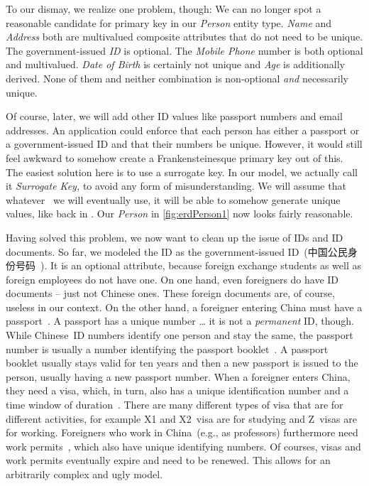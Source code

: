 To our dismay, we realize one problem, though:
We can no longer spot a reasonable candidate for primary key in our \emph{Person} entity type.
\emph{Name} and \emph{Address} both are multivalued composite attributes that do not need to be unique.
The government-issued \emph{ID} is optional.
The \emph{Mobile Phone} number is both optional and multivalued.
\emph{Date of Birth} is certainly not unique and \emph{Age} is additionally derived.
None of them and neither combination is non-optional \emph{and} necessarily unique.

Of course, later, we will add other ID values like passport numbers and email addresses.
An application could enforce that each person has either a passport or a government-issued ID and that their numbers be unique.
However, it would still feel awkward to somehow create a Frankensteinesque primary key out of this.
The easiest solution here is to use a surrogate key.
In our model, we actually call it \emph{Surrogate Key,} to avoid any form of misunderstanding.
We will assume that whatever \dbms\ we will eventually use, it will be able to somehow generate unique values, like back in .
Our \emph{Person} in \cref{fig:erdPerson1} now looks fairly reasonable.

Having solved this problem, we now want to clean up the issue of IDs and ID documents.
So far, we modeled the ID as the government-issued ID~(中国公民身份号码~\cite{GB116431999CIN}).
It is an optional attribute, because foreign exchange students as well as foreign employees do not have one.
On one hand, even foreigners do have ID documents -- just not Chinese ones.
These foreign documents are, of course, useless in our context.
On the other hand, a foreigner entering China must have a passport~\cite{ICAO2021MRTDP3SCTAMEE}.
A passport has a unique number {\dots} it is not a \emph{permanent} ID, though.
While Chinese~ID numbers identify one person and stay the same, the passport number is usually a number identifying the passport booklet~\cite{ICAO2004TAGOMRTDFMUOPINAPN}.
A passport booklet usually stays valid for ten years and then a new passport is issued to the person, usually having a new passport number.
When a foreigner enters China, they need a visa, which, in turn, also has a unique identification number and a time window of duration~\cite{CMOFA2019ITCV}.
There are many different types of visa that are for different activities, for example X1 and X2~visa are for studying and Z~visas are for working.
Foreigners who work in China~(e.g., as professors) furthermore need work permits~\cite{BD2006BDBK:WOFFITOROC}, which also have unique identifying numbers.
Of courses, visas and work permits eventually expire and need to be renewed.
This allows for an arbitrarily complex and ugly model.

